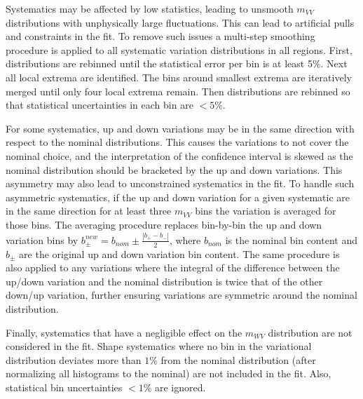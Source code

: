 Systematics may be affected by low statistics, leading to unsmooth $m_{VV}$ distributions with unphysically large fluctuations. This can lead to artificial pulls and constraints in the fit. To remove such issues a multi-step smoothing procedure is applied to all systematic variation distributions in all regions. First, distributions are rebinned until the statistical error per bin is at least 5\%. Next all local extrema are identified. The bins around smallest extrema are iteratively merged until only four local extrema remain. Then distributions are rebinned so that statistical uncertainties in each bin are $< 5\%$.

For some systematics, up and down variations may be in the same direction with respect to the nominal distributions. This causes the variations to not cover the nominal choice, and the interpretation of the confidence interval is skewed as the nominal distribution should be bracketed by the up and down variations. This asymmetry may also lead to unconstrained systematics in the fit. To handle such asymmetric systematics, if the up and down variation for a given systematic are in the same direction for at least three $m_{VV}$ bins the variation is averaged for those bins. The averaging procedure replaces bin-by-bin the up and down variation bins by $b_{\pm}^{new}=b_{nom}\pm\frac{|b_{+}-b_{-}|}{2}$, where $b_{nom}$ is the nominal bin content and $b_{\pm}$ are the original up and down variation bin content. The same procedure is also applied to any variations where the integral of the difference between the up/down variation and the nominal distribution is twice that of the other down/up variation, further ensuring variations are symmetric around the nominal distribution.

Finally, systematics that have a negligible effect on the $m_{WV}$ distribution are not considered in the fit. Shape systematics where no bin in the variational distribution deviates more than $1\%$ from the nominal distribution (after normalizing all histograms to the nominal) are not included in the fit. Also, statistical bin uncertainties $< 1\%$ are ignored. 

